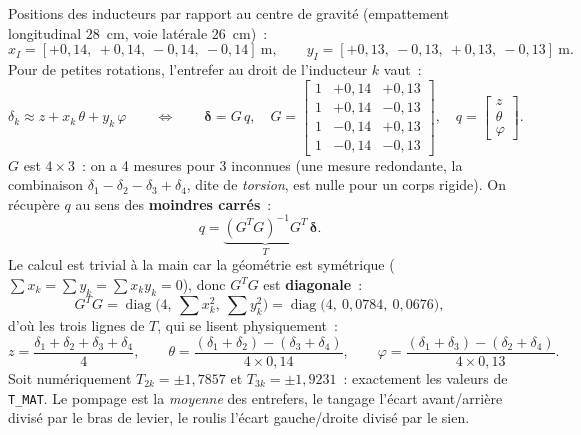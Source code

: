 \documentclass[a4paper,11pt]{article}
\begin{document}
Positions des inducteurs par rapport au centre de gravité (empattement
longitudinal $28$~cm, voie latérale $26$~cm)~:
\begin{equation}
    x_I = [+0{,}14,\ +0{,}14,\ -0{,}14,\ -0{,}14]\ \text{m},
    \qquad
    y_I = [+0{,}13,\ -0{,}13,\ +0{,}13,\ -0{,}13]\ \text{m}.
\end{equation}
Pour de petites rotations, l'entrefer au droit de l'inducteur $k$ vaut~:
\begin{equation}
    \delta_k \approx z + x_k\,\theta + y_k\,\varphi
    \qquad\Longleftrightarrow\qquad
    \boldsymbol{\delta} = G\,q,
    \quad
    G = \begin{bmatrix}
        1 & +0{,}14 & +0{,}13 \\
        1 & +0{,}14 & -0{,}13 \\
        1 & -0{,}14 & +0{,}13 \\
        1 & -0{,}14 & -0{,}13
    \end{bmatrix},
    \quad
    q = \begin{bmatrix} z \\ \theta \\ \varphi \end{bmatrix}.
\end{equation}
$G$ est $4\times3$~: on a 4 mesures pour 3 inconnues (une mesure redondante,
la combinaison $\delta_1 - \delta_2 - \delta_3 + \delta_4$, dite de
\emph{torsion}, est nulle pour un corps rigide). On récupère $q$ au sens des
\textbf{moindres carrés}~:
\begin{equation}
    q = \underbrace{(G^T G)^{-1} G^T}_{T}\,\boldsymbol{\delta}.
\end{equation}
Le calcul est trivial à la main car la géométrie est symétrique
($\sum x_k = \sum y_k = \sum x_k y_k = 0$), donc $G^T G$ est
\textbf{diagonale}~:
\begin{equation}
    G^T G = \operatorname{diag}\Big(4,\ \textstyle\sum x_k^2,\ \sum y_k^2\Big)
          = \operatorname{diag}\big(4,\ 0{,}0784,\ 0{,}0676\big),
\end{equation}
d'où les trois lignes de $T$, qui se lisent physiquement~:
\begin{equation}
    z = \frac{\delta_1+\delta_2+\delta_3+\delta_4}{4},
    \qquad
    \theta = \frac{(\delta_1+\delta_2)-(\delta_3+\delta_4)}{4 \times 0{,}14},
    \qquad
    \varphi = \frac{(\delta_1+\delta_3)-(\delta_2+\delta_4)}{4 \times 0{,}13}.
\end{equation}
Soit numériquement $T_{2k} = \pm 1{,}7857$ et $T_{3k} = \pm 1{,}9231$~:
exactement les valeurs de \texttt{T\_MAT}. Le pompage est la \emph{moyenne}
des entrefers, le tangage l'écart avant/arrière divisé par le bras de levier,
le roulis l'écart gauche/droite divisé par le sien.
\end{document}
